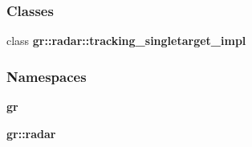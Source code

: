 \subsubsection*{Classes}
\begin{DoxyCompactItemize}
\item 
class {\bf gr\+::radar\+::tracking\+\_\+singletarget\+\_\+impl}
\end{DoxyCompactItemize}
\subsubsection*{Namespaces}
\begin{DoxyCompactItemize}
\item 
 {\bf gr}
\item 
 {\bf gr\+::radar}
\end{DoxyCompactItemize}

